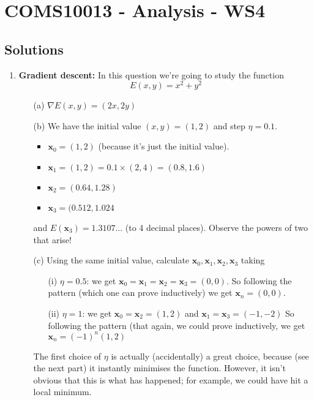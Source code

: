 \documentclass[11pt,a4paper]{scrartcl}
\begin{document}
\section*{COMS10013 - Analysis - WS4}

\subsection*{Solutions}


\begin{enumerate}
\item {\textbf{Gradient descent: }} In this question we're going to study the function 
\[E(x,y) = x^2 + y^2\]
\begin{enumerate}
    \item[(a)] $\nabla E(x,y) = (2x,2y)$
    \item[(b)]  We have the  initial value $(x,y) = (1,2)$ and step $\eta = 0.1$.
    \begin{itemize}
        \item $\mathbf{x}_0 = (1,2)$ (because it's just the initial value).
        \item $\mathbf{x}_1 = (1,2) = 0.1\times (2,4)  = (0.8,1.6)$
        \item $\mathbf{x}_2 = (0.64,1.28)$
        \item $\mathbf{x}_3 = (0.512,1.024$
    \end{itemize}
    and $E(\mathbf{x}_3) = 1.3107...$ (to 4 decimal places). Observe the powers of two that arise!
    \item[(c)] Using the same initial value, calculate $\mathbf{x}_0, \mathbf{x}_1, \mathbf{x}_2, \mathbf{x}_3$ taking
    \begin{enumerate}
        \item[(i)] $\eta = 0.5$: we get  $\mathbf{x}_0=\mathbf{x}_1=\mathbf{x}_2= \mathbf{x}_3=(0,0)$. So following the pattern (which one can prove inductively) we get $\mathbf{x}_n = (0,0)$.
        \item[(ii)] $\eta = 1$: we get $\mathbf{x}_0=\mathbf{x}_2= (1,2)$ and $\mathbf{x}_1= \mathbf{x}_3=(-1,-2)$ So following the pattern (that again, we could prove inductively, we get $\mathbf{x}_n = (-1)^n(1,2)$
    \end{enumerate}
    The first choice of $\eta$ is actually (accidentally) a great choice, because (see the next part) it instantly minimises the function. However, it isn't obvious that this is what has happened; for example, we could have hit a local minimum. 
    

\end{enumerate}
\end{enumerate}
\end{document}

